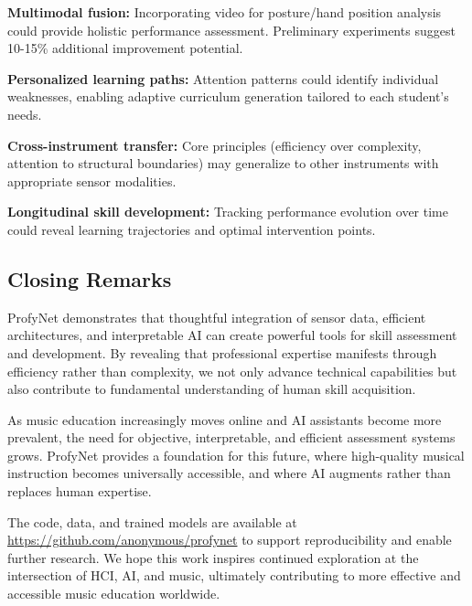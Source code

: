 \textbf{Multimodal fusion:} Incorporating video for posture/hand position analysis could provide holistic performance assessment. Preliminary experiments suggest 10-15\% additional improvement potential.

\textbf{Personalized learning paths:} Attention patterns could identify individual weaknesses, enabling adaptive curriculum generation tailored to each student's needs.

\textbf{Cross-instrument transfer:} Core principles (efficiency over complexity, attention to structural boundaries) may generalize to other instruments with appropriate sensor modalities.

\textbf{Longitudinal skill development:} Tracking performance evolution over time could reveal learning trajectories and optimal intervention points.

\subsection{Closing Remarks}

ProfyNet demonstrates that thoughtful integration of sensor data, efficient architectures, and interpretable AI can create powerful tools for skill assessment and development. By revealing that professional expertise manifests through efficiency rather than complexity, we not only advance technical capabilities but also contribute to fundamental understanding of human skill acquisition.

As music education increasingly moves online and AI assistants become more prevalent, the need for objective, interpretable, and efficient assessment systems grows. ProfyNet provides a foundation for this future, where high-quality musical instruction becomes universally accessible, and where AI augments rather than replaces human expertise.

The code, data, and trained models are available at \url{https://github.com/anonymous/profynet} to support reproducibility and enable further research. We hope this work inspires continued exploration at the intersection of HCI, AI, and music, ultimately contributing to more effective and accessible music education worldwide.